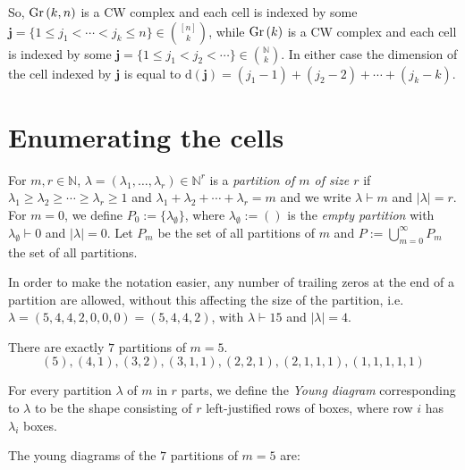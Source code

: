 So, $\Gr{k}{n}$ is a CW complex and each cell is indexed by some $\mathbf{j}=\{1\leq j_1<\cdots<j_k\leq n\}\in\binom{[n]}{k}$, while $\Gr{k}$ is a CW complex and each cell is indexed by some $\mathbf{j}=\{1\leq j_1<j_2<\cdots\}\in\binom{\mathbb{N}}{k}$. In either case the dimension of the cell indexed by $\mathbf{j}$ is equal to $\mathrm{d}(\mathbf{j})=(j_1-1)+(j_2-2)+\cdots+(j_k-k)$.

\section{Enumerating the cells}
\begin{definition} For $m,r\in\mathbb{N}$, $\lambda=(\lambda_1,\ldots,\lambda_r)\in\mathbb{N}^r$ is a \emph{partition of $m$ of size $r$} if $\lambda_1\geq\lambda_2\geq\cdots\geq\lambda_r\geq1$ and $\lambda_1+\lambda_2+\cdots+\lambda_r=m$ and we write $\lambda\vdash m$ and $|\lambda|=r$. For $m=0$, we define $P_0:=\{\lambda_{\emptyset}\}$, where $\lambda_{\emptyset}:=()$ is the \emph{empty partition} with $\lambda_{\emptyset}\vdash0$ and $|\lambda|=0$. Let $P_m$ be the set of all partitions of $m$ and $P:=\bigcup_{m=0}^{\infty}P_m$ the set of all partitions.
\end{definition}
\begin{remark}
In order to make the notation easier, any number of trailing zeros at the end of a partition are allowed, without this affecting the size of the partition, i.e.\ $\lambda=(5,4,4,2,0,0,0)=(5,4,4,2)$, with $\lambda\vdash15$ and $|\lambda|=4$.
\end{remark}
\begin{example} There are exactly $7$ partitions of $m=5$.
\[(5), (4,1), (3,2), (3,1,1), (2,2,1), (2,1,1,1), (1,1,1,1,1)\]
\end{example}

\begin{notation} For every partition $\lambda$ of $m$ in $r$ parts, we define the \emph{Young diagram} corresponding to $\lambda$ to be the shape consisting of $r$ left-justified rows of boxes, where row $i$ has $\lambda_i$ boxes.
\end{notation}
\begin{example} The young diagrams of the $7$ partitions of $m=5$ are:
\begin{center}
\qquad{}\qquad{}\qquad{}\qquad{}\qquad{}\qquad{}
\end{center}
\end{example}

